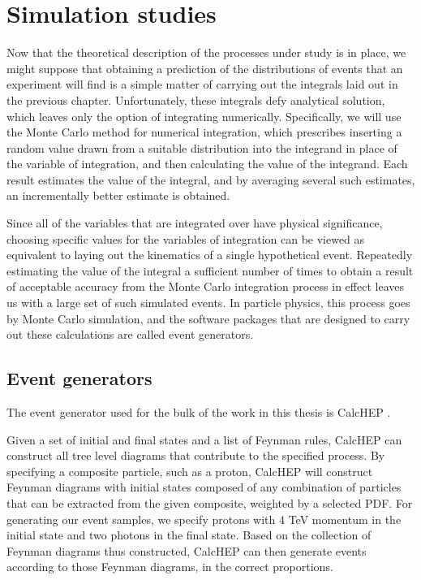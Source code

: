 \chapter{Simulation studies}\label{ch.mc}

Now that the theoretical description of the processes under study is in place, we might suppose that obtaining a prediction of the distributions of events that an experiment will find is a simple matter of carrying out the integrals laid out in the previous chapter. Unfortunately, these integrals defy analytical solution, which leaves only the option of integrating numerically. Specifically, we will use the Monte Carlo method for numerical integration, which prescribes inserting a random value drawn from a suitable distribution into the integrand in place of the variable of integration, and then calculating the value of the integrand. Each result estimates the value of the integral, and by averaging several such estimates, an incrementally better estimate is obtained.

Since all of the variables that are integrated over have physical significance, choosing specific values for the variables of integration can be viewed as equivalent to laying out the kinematics of a single hypothetical event. Repeatedly estimating the value of the integral a sufficient number of times to obtain a result of acceptable accuracy from the Monte Carlo integration process in effect leaves us with a large set of such simulated events. In particle physics, this process goes by Monte Carlo simulation, and the software packages that are designed to carry out these calculations are called event generators.

\section{Event generators}

The event generator used for the bulk of the work in this thesis is CalcHEP \cite{calchep}.

Given a set of initial and final states and a list of Feynman rules, CalcHEP can construct all tree level diagrams that contribute to the specified process. By specifying a composite particle, such as a proton, CalcHEP will construct Feynman diagrams with initial states composed of any combination of particles that can be extracted from the given composite, weighted by a selected PDF. For generating our event samples, we specify protons with 4 TeV momentum in the initial state and two photons in the final state. Based on the collection of Feynman diagrams thus constructed, CalcHEP can then generate events according to those Feynman diagrams, in the correct proportions.

